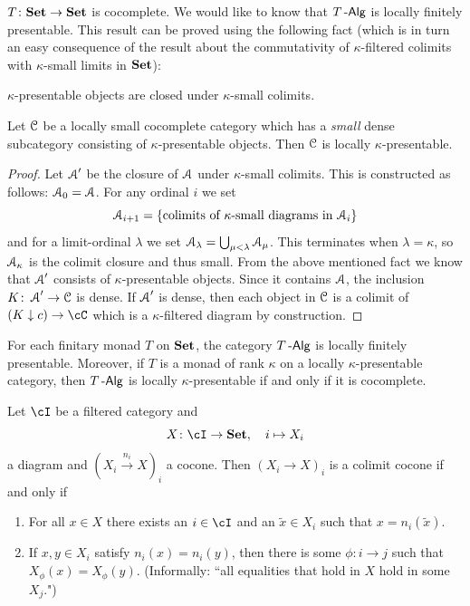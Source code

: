 \documentclass[a4paper,11pt,oneside,openany]{scrbook}
\begin{document}
$T\colon{\normalfont\textbf{Set}}\to{\normalfont\textbf{Set}}$ is cocomplete. We would like to know that $T\operatorname{-\mathsf{Alg}}$ is
locally finitely presentable. This result can be proved using the following fact
(which is in turn an easy consequence of the result about the commutativity of
$\kappa$-filtered colimits with $\kappa$-small limits in ${\normalfont\textbf{Set}}$):
\begin{center}
	$\kappa$-presentable objects are closed under $\kappa$-small colimits.
\end{center}
\begin{prop}
	Let $\operatorname{\mathcal{C}}$ be a locally small cocomplete category which has a \emph{small}
    dense subcategory consisting of $\kappa$-presentable objects. Then $\operatorname{\mathcal{C}}$ is
    locally $\kappa$-presentable.
\end{prop}
\begin{proof}
	Let $\operatorname{\mathcal{A}}'$ be the closure of $\operatorname{\mathcal{A}} $ under $ \kappa $-small  colimits.
	This is constructed as follows: $\operatorname{\mathcal{A}}_0 =\operatorname{\mathcal{A}} $.
	For any ordinal $ i $ we set
	\begin{displaymath}
		\operatorname{\mathcal{A}}_{i+1} = \{\text{colimits of $ \kappa $-small diagrams in $\operatorname{\mathcal{A}}_i $\}}
	\end{displaymath}
	and for a limit-ordinal $ \lambda $ we set $\operatorname{\mathcal{A}}_\lambda =
    \bigcup_{\mu<\lambda}\operatorname{\mathcal{A}}_{\mu} $.
	This terminates when $ \lambda = \kappa $, so $\operatorname{\mathcal{A}}_\kappa $ is the colimit
    closure and thus small.
	From the above mentioned fact we know that $\operatorname{\mathcal{A}}'  $ consists of $ \kappa
    $-presentable objects.
	Since it contains $\operatorname{\mathcal{A}} $, the inclusion $ K \colon\operatorname{\mathcal{A}}' \to \operatorname{\mathcal{C}} $ is dense.
	If $\operatorname{\mathcal{A}}' $ is dense, then each object in $ \operatorname{\mathcal{C}} $ is a colimit of $(K\downarrow
    c)\rightarrow\cC$ which is a $ \kappa $-filtered diagram by construction.
\end{proof}
\begin{cor}
	For each finitary monad $T$ on ${\normalfont\textbf{Set}}$, the category $T\operatorname{-\mathsf{Alg}}$ is locally
    finitely presentable. Moreover, if $T$ is a monad of rank $\kappa$ on a
    locally $\kappa$-presentable category, then $T\operatorname{-\mathsf{Alg}}$ is locally
    $\kappa$-presentable if and only if it is cocomplete.
\end{cor}
\begin{thm}
	Let $\cI$ be a filtered category and
	\begin{displaymath}
		X\colon\cI\to\Set,\quad i\mapsto X_i
	\end{displaymath}
	a diagram and $(X_i\xrightarrow{n_i}X)_i$ a cocone.
	Then $(X_i\to X)_i$ is a colimit cocone if and only if
	\begin{enumerate}[label=\roman*)]
		\item For all $x\in X$ there exists an $i\in\cI$ and an $\tilde x\in
            X_i$ such that $x=n_i(\tilde x)$.
		\item If $ x , y \in X_i $ satisfy $ n_i(x) = n_i(y) $, then there is
            some $ \phi \colon i\to j $ such that $ X_\phi(x) = X_\phi(y) $.
            (Informally: ``all equalities that hold in $X$ hold in some $X_j$.")
	\end{enumerate}
\end{thm}
\end{document}

